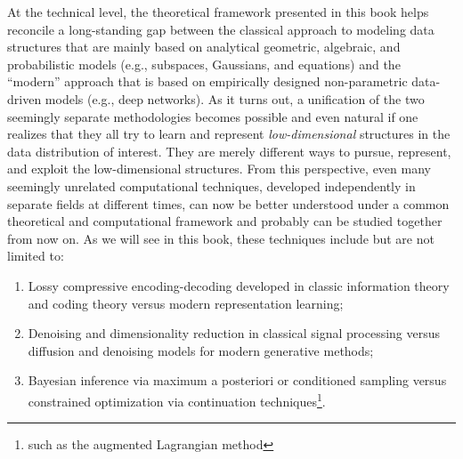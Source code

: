 \documentclass[../../book-main.tex]{subfiles}
\begin{document}
At the technical level, the theoretical framework presented in this
book helps reconcile a long-standing gap between the classical
approach to modeling data structures that are mainly based on
analytical geometric, algebraic, and probabilistic models (e.g.,
subspaces, Gaussians, and equations) and the ``modern'' approach that
is based on empirically designed non-parametric data-driven models (e.g., deep
networks). As it turns out, a unification of the two seemingly
separate methodologies becomes possible and even natural if one
realizes that they all try to learn and represent {\em low-dimensional}
structures in the data distribution of interest. They are merely
different ways to pursue, represent, and exploit the low-dimensional
structures. From this perspective, even many seemingly unrelated
computational techniques, developed independently in separate fields
at different times, can now be better understood under a common theoretical and
computational framework and probably can be studied together from now
on. As we will see in this book, these techniques include but are not
limited to:
\begin{enumerate}
    \item Lossy compressive encoding-decoding developed in classic
        information theory and coding theory versus modern
        representation learning;
    \item Denoising and dimensionality reduction in classical signal
        processing versus diffusion and denoising models for modern
        generative methods;
    \item Bayesian inference via maximum a posteriori or conditioned
        sampling versus  constrained optimization via continuation
        techniques\footnote{such as the augmented Lagrangian method}.
\end{enumerate}
\end{document}
